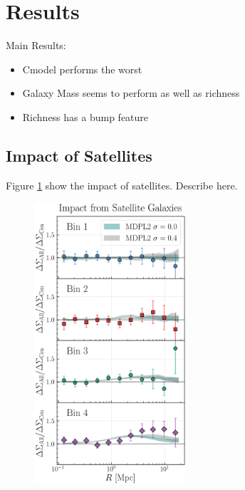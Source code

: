 \documentclass[a4paper,fleqn,usenatbib]{mnras}
\begin{document}
\section{Results}

Main Results:
\begin{itemize}
    \item Cmodel performs the worst
    \item Galaxy Mass seems to perform as well as richness
    \item Richness has a bump feature
\end{itemize}
    \label{sec:result}
 

\subsection{Impact of Satellites}

Figure \ref{fig:satellite} show the impact of satellites. Describe here.


  \begin{figure}
      \centering 
      \includegraphics[width=0.5\textwidth]{figure/dsigma_sat_ratio}
      \caption{
          }
      \label{fig:satellite}
  \end{figure}
\end{document}
